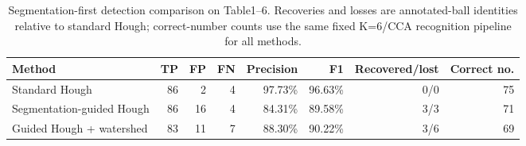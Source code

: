 \begin{table}[htbp]
\centering
\small
\caption{Segmentation-first detection comparison on Table1--6. Recoveries and losses are annotated-ball identities relative to standard Hough; correct-number counts use the same fixed K=6/CCA recognition pipeline for all methods.}
\label{tab:segmentation-hough-summary}
\begin{tabular}{lrrrrrrr}
\toprule
Method & TP & FP & FN & Precision & F1 & Recovered/lost & Correct no. \\
\midrule
Standard Hough & 86 & 2 & 4 & 97.73\% & 96.63\% & 0/0 & 75 \\
Segmentation-guided Hough & 86 & 16 & 4 & 84.31\% & 89.58\% & 3/3 & 71 \\
Guided Hough + watershed & 83 & 11 & 7 & 88.30\% & 90.22\% & 3/6 & 69 \\
\bottomrule
\end{tabular}
\end{table}
\FloatBarrier
